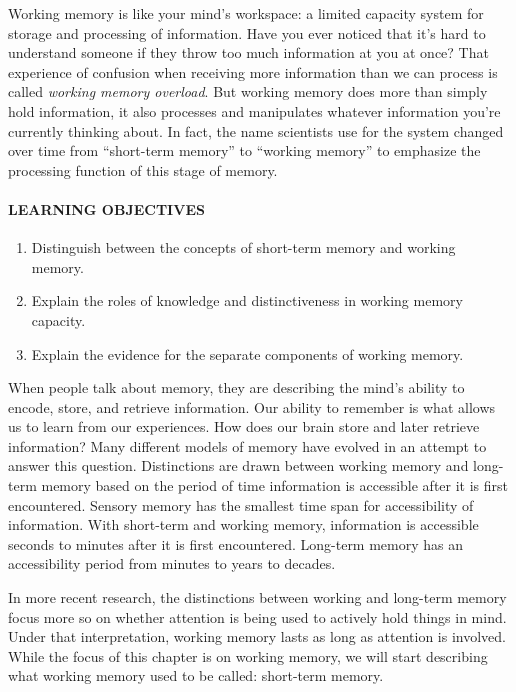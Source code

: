 \documentclass[
]{krantz}
\providecommand{\tightlist}{%
  \setlength{\itemsep}{0pt}\setlength{\parskip}{0pt}}
\begin{document}
Working memory is like your mind's workspace: a limited capacity system for storage and processing of information. Have you ever noticed that it's hard to understand someone if they throw too much information at you at once? That experience of confusion when receiving more information than we can process is called \emph{working memory overload}. But working memory does more than simply hold information, it also processes and manipulates whatever information you're currently thinking about. In fact, the name scientists use for the system changed over time from ``short-term memory'' to ``working memory'' to emphasize the processing function of this stage of memory.

\paragraph*{LEARNING OBJECTIVES}\label{learning-objectives-3}

\begin{enumerate}
\def\labelenumi{\arabic{enumi}.}
\tightlist
\item
  Distinguish between the concepts of short-term memory and working memory.
\item
  Explain the roles of knowledge and distinctiveness in working memory capacity.
\item
  Explain the evidence for the separate components of working memory.
\end{enumerate}

When people talk about memory, they are describing the mind's ability to encode, store, and retrieve information. Our ability to remember is what allows us to learn from our experiences. How does our brain store and later retrieve information? Many different models of memory have evolved in an attempt to answer this question. Distinctions are drawn between working memory and long-term memory based on the period of time information is accessible after it is first encountered. Sensory memory has the smallest time span for accessibility of information. With short-term and working memory, information is accessible seconds to minutes after it is first encountered. Long-term memory has an accessibility period from minutes to years to decades.

In more recent research, the distinctions between working and long-term memory focus more so on whether attention is being used to actively hold things in mind. Under that interpretation, working memory lasts as long as attention is involved. While the focus of this chapter is on working memory, we will start describing what working memory used to be called: short-term memory.
\end{document}

